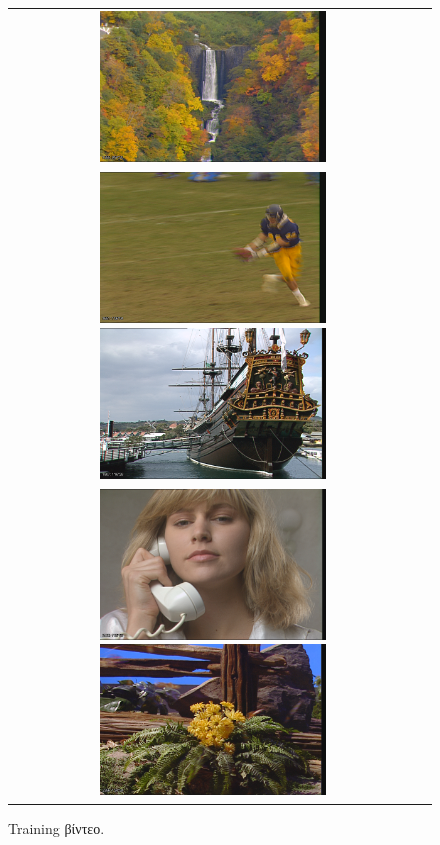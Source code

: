 \begin{figure}[p]
\begin{tabular}{c c}
    \includegraphics[height=4.0cm]{chapter4/frames/src18.png}\\
    \includegraphics[height=4.0cm]{chapter4/frames/src19.png}
    \includegraphics[height=4.0cm]{chapter4/frames/src20.png}\\
    \includegraphics[height=4.0cm]{chapter4/frames/src21.png}
    \includegraphics[height=4.0cm]{chapter4/frames/src22.png}
\end{tabular}
\caption{Training βίντεο. \cite{misc:jm}}
\label{fig:trainingset}
\end{figure}

